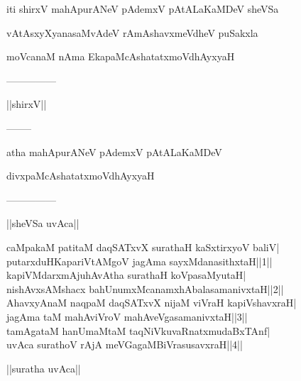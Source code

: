 \documentclass{article}
\begin{document}
\begin{center}
iti shirxV mahApurANeV pAdemxV pAtALaKaMDeV sheVSa
\end{center}

\begin{center}
vAtAsxyXyanasaMvAdeV rAmAshavxmeVdheV puSakxla
\end{center}

\begin{center}
moVcanaM nAma EkapaMcAshatatxmoVdhAyxyaH
\end{center}

\begin{center}
---------------
\end{center}

\begin{center}
||shirxV||
\end{center}

\begin{center}
--------
\end{center}

\begin{center}
atha mahApurANeV pAdemxV pAtALaKaMDeV
\end{center}

\begin{center}
divxpaMcAshatatxmoVdhAyxyaH
\end{center}

\begin{center}
---------------
\end{center}

\begin{center}
||sheVSa uvAca||
\end{center}

caMpakaM patitaM daqSATxvX surathaH kaSxtirxyoV baliV|\\
putarxduHKapariVtAMgoV jagAma sayxMdanasithxtaH||1||\\
kapiVMdarxmAjuhAvAtha surathaH koVpasaMyutaH|\\
nishAvxsAMshacx bahUnumxMcanamxhAbalasamanivxtaH||2||\\
AhavxyAnaM naqpaM daqSATxvX nijaM viVraH kapiVshavxraH|\\
jagAma taM mahAviVroV mahAveVgasamanivxtaH||3||\\
tamAgataM hanUmaMtaM taqNiVkuvaRnatxmudaBxTAnf|\\
uvAca surathoV rAjA meVGagaMBiVrasusavxraH||4||\\

\begin{center}
||suratha uvAca||
\end{center}
\end{document}
